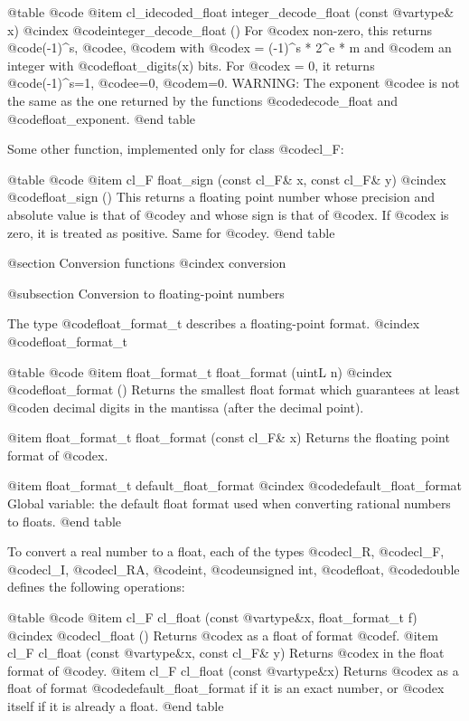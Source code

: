 @table @code
@item cl_idecoded_float integer_decode_float (const @var{type}& x)
@cindex @code{integer_decode_float ()}
For @code{x} non-zero, this returns @code{(-1)^s}, @code{e}, @code{m} with
@code{x = (-1)^s * 2^e * m} and @code{m} an integer with @code{float_digits(x)}
bits. For @code{x} = 0, it returns @code{(-1)^s}=1, @code{e}=0, @code{m}=0.
WARNING: The exponent @code{e} is not the same as the one returned by
the functions @code{decode_float} and @code{float_exponent}.
@end table

Some other function, implemented only for class @code{cl_F}:

@table @code
@item cl_F float_sign (const cl_F& x, const cl_F& y)
@cindex @code{float_sign ()}
This returns a floating point number whose precision and absolute value
is that of @code{y} and whose sign is that of @code{x}. If @code{x} is
zero, it is treated as positive. Same for @code{y}.
@end table


@section Conversion functions
@cindex conversion

@subsection Conversion to floating-point numbers

The type @code{float_format_t} describes a floating-point format.
@cindex @code{float_format_t}

@table @code
@item float_format_t float_format (uintL n)
@cindex @code{float_format ()}
Returns the smallest float format which guarantees at least @code{n}
decimal digits in the mantissa (after the decimal point).

@item float_format_t float_format (const cl_F& x)
Returns the floating point format of @code{x}.

@item float_format_t default_float_format
@cindex @code{default_float_format}
Global variable: the default float format used when converting rational numbers
to floats.
@end table

To convert a real number to a float, each of the types
@code{cl_R}, @code{cl_F}, @code{cl_I}, @code{cl_RA},
@code{int}, @code{unsigned int}, @code{float}, @code{double}
defines the following operations:

@table @code
@item cl_F cl_float (const @var{type}&x, float_format_t f)
@cindex @code{cl_float ()}
Returns @code{x} as a float of format @code{f}.
@item cl_F cl_float (const @var{type}&x, const cl_F& y)
Returns @code{x} in the float format of @code{y}.
@item cl_F cl_float (const @var{type}&x)
Returns @code{x} as a float of format @code{default_float_format} if
it is an exact number, or @code{x} itself if it is already a float.
@end table

